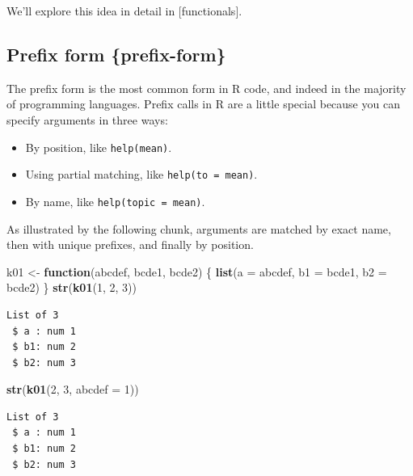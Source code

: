 \documentclass[]{book}
\newenvironment{Shaded}{\begin{snugshade}}{\end{snugshade}}
\newcommand{\ControlFlowTok}[1]{\textcolor[rgb]{0.13,0.29,0.53}{\textbf{#1}}}
\newcommand{\DataTypeTok}[1]{\textcolor[rgb]{0.13,0.29,0.53}{#1}}
\newcommand{\DecValTok}[1]{\textcolor[rgb]{0.00,0.00,0.81}{#1}}
\newcommand{\KeywordTok}[1]{\textcolor[rgb]{0.13,0.29,0.53}{\textbf{#1}}}
\newcommand{\NormalTok}[1]{#1}
\newcommand{\StringTok}[1]{\textcolor[rgb]{0.31,0.60,0.02}{#1}}
\providecommand{\tightlist}{%
  \setlength{\itemsep}{0pt}\setlength{\parskip}{0pt}}
\theoremstyle{definition}
\theoremstyle{definition}
\theoremstyle{definition}
\theoremstyle{remark}
\begin{document}
We'll explore this idea in detail in {[}functionals{]}.

\hypertarget{prefix-form-prefix-form}{%
\subsection{Prefix form \{prefix-form\}}\label{prefix-form-prefix-form}}

The prefix form is the most common form in R code, and indeed in the
majority of programming languages. Prefix calls in R are a little
special because you can specify arguments in three ways:

\begin{itemize}
\tightlist
\item
  By position, like \texttt{help(mean)}.
\item
  Using partial matching, like \texttt{help(to\ =\ mean)}.
\item
  By name, like \texttt{help(topic\ =\ mean)}.
\end{itemize}

As illustrated by the following chunk, arguments are matched by exact
name, then with unique prefixes, and finally by position.

\begin{Shaded}
\begin{Highlighting}[]
\NormalTok{k01 <-}\StringTok{ }\ControlFlowTok{function}\NormalTok{(abcdef, bcde1, bcde2) \{}
  \KeywordTok{list}\NormalTok{(}\DataTypeTok{a =}\NormalTok{ abcdef, }\DataTypeTok{b1 =}\NormalTok{ bcde1, }\DataTypeTok{b2 =}\NormalTok{ bcde2)}
\NormalTok{\}}
\KeywordTok{str}\NormalTok{(}\KeywordTok{k01}\NormalTok{(}\DecValTok{1}\NormalTok{, }\DecValTok{2}\NormalTok{, }\DecValTok{3}\NormalTok{))}
\end{Highlighting}
\end{Shaded}

\begin{verbatim}
List of 3
 $ a : num 1
 $ b1: num 2
 $ b2: num 3
\end{verbatim}

\begin{Shaded}
\begin{Highlighting}[]
\KeywordTok{str}\NormalTok{(}\KeywordTok{k01}\NormalTok{(}\DecValTok{2}\NormalTok{, }\DecValTok{3}\NormalTok{, }\DataTypeTok{abcdef =} \DecValTok{1}\NormalTok{))}
\end{Highlighting}
\end{Shaded}

\begin{verbatim}
List of 3
 $ a : num 1
 $ b1: num 2
 $ b2: num 3
\end{verbatim}
\end{document}
